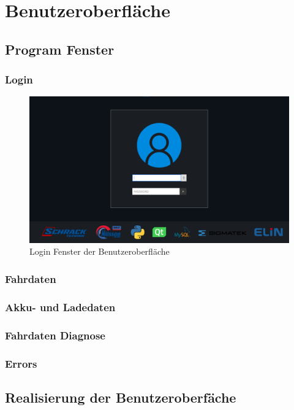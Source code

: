 \section{Benutzeroberfläche}

\subsection{Program Fenster}
\subsubsection{Login}
\begin{figure}[H]
	\begin{center}
		\includegraphics[scale=0.25]{figures/hcis/window_login.png}
		\caption{Login Fenster der Benutzeroberfläche}
	\end{center}
\end{figure}
\subsubsection{Fahrdaten}
\subsubsection{Akku- und Ladedaten}
\subsubsection{Fahrdaten Diagnose}
\subsubsection{Errors}
\subsection{Realisierung der Benutzeroberfäche}


